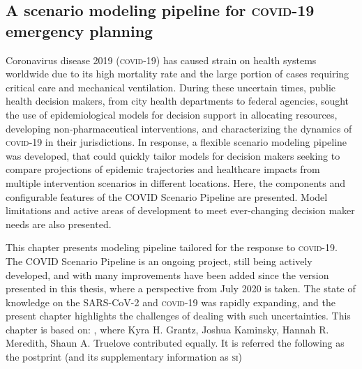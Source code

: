 \begin{fullwidth}
\chapter[A scenario modeling pipeline for \textsc{covid}-19 emergency planning]{A scenario modeling pipeline for \textsc{covid}-19 \\emergency planning}
\label{sec:covid-pipeline-reports}
Coronavirus disease 2019 (\textsc{covid}-19) has caused strain on health systems worldwide due to its high mortality rate and the large portion of cases requiring critical care and mechanical ventilation. During these uncertain times, public health decision makers, from city health departments to federal agencies, sought the use of epidemiological models for decision support in allocating resources, developing non‑pharmaceutical interventions, and characterizing the dynamics of \textsc{covid}‑19 in their jurisdictions. In response, a flexible scenario modeling pipeline was developed, that could quickly tailor models for decision makers seeking to compare projections of epidemic trajectories and healthcare impacts from multiple intervention scenarios in different locations. Here, the components and configurable features of the COVID  Scenario Pipeline are presented. Model limitations and active areas of development to meet ever‑changing decision maker needs are also presented.
  
This chapter presents modeling pipeline tailored for the response to \textsc{covid}-19. The COVID  Scenario Pipeline is an ongoing project, still being actively developed, and with many improvements have been added since the version presented in this thesis,  where a perspective from July 2020 is taken. The state of knowledge on the SARS-CoV-2 and \textsc{covid}-19 was rapidly expanding, and the present chapter highlights the challenges of dealing with such uncertainties. This chapter is based on:
, where Kyra H. Grantz, Joshua Kaminsky, Hannah R. Meredith, Shaun A. Truelove contributed equally. It is referred the following as the postprint (and its supplementary information as \textsc{si})
  \end{fullwidth}


